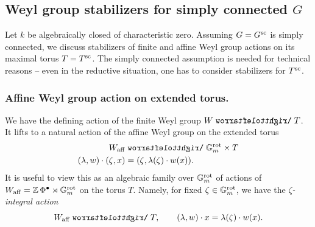 \subsection{Weyl group stabilizers for simply connected \texorpdfstring{$G$}{G}}\label{subsection: weyl group stabilizers}
Let $k$ be algebraically closed of characteristic zero.
Assuming $G = G^{\sc}$ is simply connected, we discuss stabilizers of finite and affine Weyl group actions on its maximal torus $T = T^{\sc}$. The simply connected assumption is needed for technical reasons -- even in the reductive situation, one has to consider stabilizers for $T^{\sc}$.



\subsubsection{Affine Weyl group action on extended torus.}\label{section: actions I}
We have the defining action of the finite Weyl group $W \acts T$. It lifts to a natural action of the affine Weyl group on the extended torus
\begin{align}\label{equation: affine weyl group action I}
\begin{split}
W_{\aff} &\acts \Gm^{\rot} \times T \\
(\lambda, w) \cdot (\zeta, x) &= (\zeta, \lambda(\zeta) \cdot w(x)).
\end{split}
\end{align}
It is useful to view this as an algebraic family over $\Gm^{\rot}$ of actions of $W_{\aff} = \Z\Phi^{\bullet} \rtimes \Gm^{\rot}$ on the torus $T$. Namely, for fixed $\zeta \in \Gm^{\rot}$, we have the \emph{$\zeta$-integral action}
\begin{equation}\label{equation: zeta integral action of affine Weyl group}
W_{\aff} \acts T, \qquad (\lambda, w) \cdot x = \lambda(\zeta) \cdot w(x).    
\end{equation}


